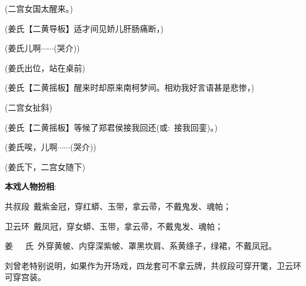 (二宫女\hspace{15pt}国太醒来。)

(姜氏\hspace{20pt}【{\akai 二黄导板}】适才间见娇儿肝肠痛断，)

(姜氏\hspace{20pt}儿啊$\cdots${}$\cdots{}$({\hwfs 哭介}))

(姜氏{\hwfs 出位}，{\hwfs 站在桌前})

(姜氏\hspace{20pt}【{\akai 二黄摇板}】醒来时却原来南柯梦间。相劝我好言语甚是悲惨，)

({\hwfs 二}宫女{\hwfs 扯斜})

(姜氏\hspace{20pt}【{\akai 二黄摇板}】等候了郑君侯接我回还({\akai 或}:~接我回銮)。)

(姜氏\hspace{20pt}唉，儿啊$\cdots${}$\cdots{}$({\hwfs 哭介}))

(姜氏{\hwfs 下}，{\hwfs 二}宫女{\hwfs 随下})

\vspace{25pt}
{\bfseries\textrm{本戏人物扮相}}:~
\vspace{15pt}

共叔段~\hspace{20pt}戴紫金冠，穿红蟒、玉带，拿云帚，不戴鬼发、魂帕；

卫云环~\hspace{20pt}戴凤冠，穿女蟒、玉带，拿云帚，不戴鬼发、魂帕；

姜~~~氏~\hspace{20pt}外穿黄帔、内穿深紫帔、罩黑坎肩、系黄绦子，绿裙，不戴凤冠。

\vspace{15pt}
刘曾老特别说明，如果作为开场戏，四龙套可不拿云牌，共叔段可穿开氅，卫云环可穿宫装。

